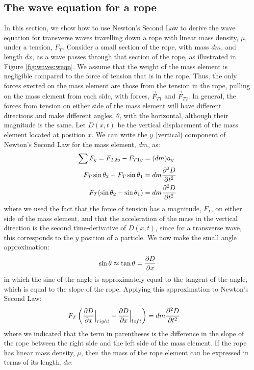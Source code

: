 \subsection{The wave equation for a rope}
In this section, we show how to use Newton's Second Law to derive the wave equation for transverse waves travelling down a rope with linear mass density, $\mu$, under a tension, $F_T$. Consider a small section of the rope, with mass $dm$, and length $dx$, as a wave passes through that section of the rope, as illustrated in Figure \ref{fig:waves:weqn}.
We assume that the weight of the mass element is negligible compared to the force of tension that is in the rope. Thus, the only forces exerted on the mass element are those from the tension in the rope, pulling on the mass element from each side, with forces, $\vec F_{T1}$ and $\vec F_{T2}$. In general, the forces from tension on either side of the mass element will have different directions and make different angles, $\theta$, with the horizontal, although their magnitude is the same. Let $D(x,t)$ be the vertical displacement of the mass element located at position $x$. We can write the $y$ (vertical) component of Newton's Second Law for the mass element, $dm$, as:
\begin{align*}
\sum F_y = F_{T2y} - F_{T1y} &= (dm)a_y\\
F_T\sin\theta_2 - F_T\sin\theta_1 &= dm \frac{\partial ^2D}{\partial t^2}\\
F_T(\sin\theta_2 - \sin\theta_1) &= dm \frac{\partial ^2D}{\partial t^2}
\end{align*}
where we used the fact that the force of tension has a magnitude, $F_T$, on either side of the mass element, and that the acceleration of the mass in the vertical direction is the second time-derivative of $D(x,t)$, since for a transverse wave, this corresponds to the $y$ position of a particle. We now make the small angle approximation:
\begin{align*}
\sin\theta\approx \tan\theta = \frac{\partial D}{\partial x}
\end{align*}
in which the sine of the angle is approximately equal to the tangent of the angle, which is equal to the slope of the rope. Applying this approximation to Newton's Second Law:
\begin{align*}
F_T\left(\frac{\partial D}{\partial x}\Bigr|_{right} - \frac{\partial D}{\partial x}\Bigr|_{left}\right) &= dm \frac{\partial ^2D}{\partial t^2}
\end{align*}
where we indicated that the term in parentheses is the difference in the slope of the rope between the right side and the left side of the mass element. If the rope has linear mass density, $\mu$, then the mass of the rope element can be expressed in terms of its length, $dx$:
